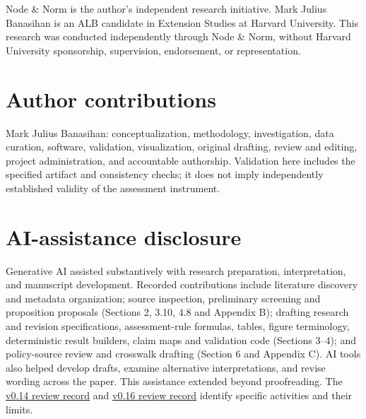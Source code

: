 \documentclass[11pt]{article}
\begin{document}
Node \& Norm is the author's independent research initiative. Mark Julius Banasihan is an ALB candidate in Extension Studies at Harvard University. This research was conducted independently through Node \& Norm, without Harvard University sponsorship, supervision, endorsement, or representation.

\section*{Author contributions}

Mark Julius Banasihan: conceptualization, methodology, investigation, data curation, software, validation, visualization, original drafting, review and editing, project administration, and accountable authorship. Validation here includes the specified artifact and consistency checks; it does not imply independently established validity of the assessment instrument.

\section*{AI-assistance disclosure}

Generative AI assisted substantively with research preparation, interpretation, and manuscript development. Recorded contributions include literature discovery and metadata organization; source inspection, preliminary screening and proposition proposals (Sections 2, 3.10, 4.8 and Appendix B); drafting research and revision specifications, assessment-rule formulas, tables, figure terminology, deterministic result builders, claim maps and validation code (Sections 3--4); and policy-source review and crosswalk drafting (Section 6 and Appendix C). AI tools also helped develop drafts, examine alternative interpretations, and revise wording across the paper. This assistance extended beyond proofreading. The \href{https://github.com/node-and-norm/trust-autonomy-evidence/blob/0775030a55a892c15b46dd9a35ad4da718f2e12d/evidence/human-review-attestation-v0.14.0.json}{v0.14 review record} and \href{https://github.com/node-and-norm/trust-autonomy-evidence/blob/0775030a55a892c15b46dd9a35ad4da718f2e12d/evidence/human-review-attestation-v0.16.0.json}{v0.16 review record} identify specific activities and their limits.
\end{document}
